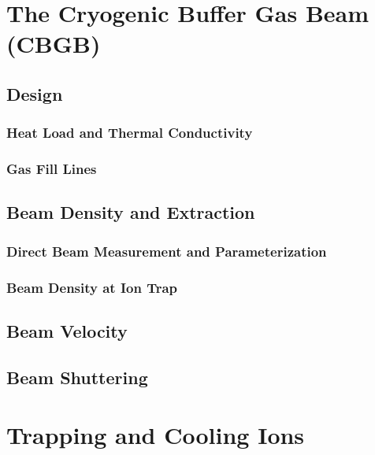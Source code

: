 \documentclass [PhD,nolistoftables,scheader] {uclathes}
\begin{document}
\chapter{The Cryogenic Buffer Gas Beam (CBGB)}


	\section{Design}
	
	
		\subsection{Heat Load and Thermal Conductivity}
		
		
		\subsection{Gas Fill Lines}
		
	
	\section{Beam Density and Extraction} \label{sec: beam density}
	
		
		\subsection{Direct Beam Measurement and Parameterization}
		
	
		\subsection{Beam Density at Ion Trap} \label{sec: trap beam density}
		
	
	\section{Beam Velocity}
	
	
	\section{Beam Shuttering}
	

\chapter{Trapping and Cooling Ions}

\end{document}
